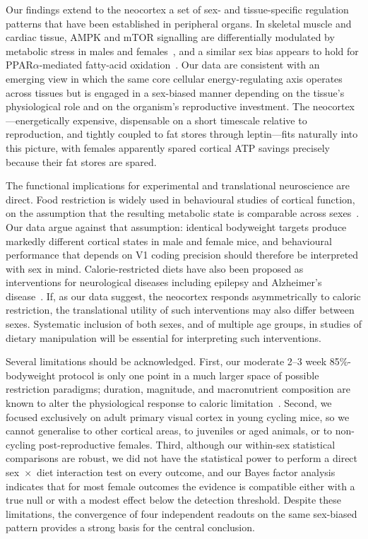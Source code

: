 \documentclass[11pt]{article}
\begin{document}
Our findings extend to the neocortex a set of sex- and tissue-specific regulation patterns that have been established in peripheral organs. In skeletal muscle and cardiac tissue, AMPK and mTOR signalling are differentially modulated by metabolic stress in males and females~\citep{steinberg2023ampk, laplante2013mtorc1}, and a similar sex bias appears to hold for PPAR$\alpha$-mediated fatty-acid oxidation~\citep{lopezdominguez2016omega3}. Our data are consistent with an emerging view in which the same core cellular energy-regulating axis operates across tissues but is engaged in a sex-biased manner depending on the tissue's physiological role and on the organism's reproductive investment. The neocortex---energetically expensive, dispensable on a short timescale relative to reproduction, and tightly coupled to fat stores through leptin---fits naturally into this picture, with females apparently spared cortical ATP savings precisely because their fat stores are spared.

The functional implications for experimental and translational neuroscience are direct. Food restriction is widely used in behavioural studies of cortical function, on the assumption that the resulting metabolic state is comparable across sexes~\citep{scott2023cisplatin, heinz2021foraging}. Our data argue against that assumption: identical bodyweight targets produce markedly different cortical states in male and female mice, and behavioural performance that depends on V1 coding precision should therefore be interpreted with sex in mind. Calorie-restricted diets have also been proposed as interventions for neurological diseases including epilepsy and Alzheimer's disease~\citep{greenfield2025lifespan}. If, as our data suggest, the neocortex responds asymmetrically to caloric restriction, the translational utility of such interventions may also differ between sexes. Systematic inclusion of both sexes, and of multiple age groups, in studies of dietary manipulation will be essential for interpreting such interventions.

Several limitations should be acknowledged. First, our moderate 2--3 week 85\%-bodyweight protocol is only one point in a much larger space of possible restriction paradigms; duration, magnitude, and macronutrient composition are known to alter the physiological response to caloric limitation~\citep{lopezdominguez2016omega3, greenfield2025lifespan, ryu2023timerestricted}. Second, we focused exclusively on adult primary visual cortex in young cycling mice, so we cannot generalise to other cortical areas, to juveniles or aged animals, or to non-cycling post-reproductive females. Third, although our within-sex statistical comparisons are robust, we did not have the statistical power to perform a direct sex~$\times$~diet interaction test on every outcome, and our Bayes factor analysis indicates that for most female outcomes the evidence is compatible either with a true null or with a modest effect below the detection threshold. Despite these limitations, the convergence of four independent readouts on the same sex-biased pattern provides a strong basis for the central conclusion.
\end{document}
